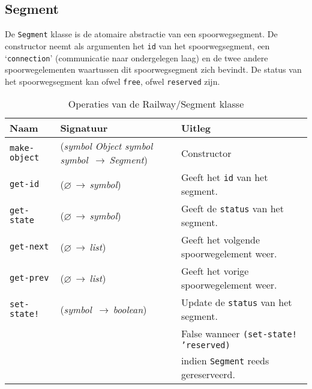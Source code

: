 \documentclass[a4paper, 11pt]{article}
\newcommand{\naar}{\,$\rightarrow$\,}
\renewcommand{\empty}{$\varnothing$}
\newcommand{\<}{\scriptsize\textless\normalsize}
\renewcommand{\>}{\scriptsize\textgreater\normalsize}
\begin{document}
\subsection{Segment} %
De \texttt{Segment} klasse is de atomaire abstractie van een spoorwegsegment. De constructor neemt als argumenten het \texttt{id} van het spoorwegsegment, een \lq\texttt{connection}' (communicatie naar ondergelegen laag) en de twee andere spoorwegelementen waartussen dit spoorwegsegment zich bevindt. De status van het spoorwegsegment kan ofwel \texttt{free}, ofwel \texttt{reserved} zijn.
\begin{table}[H]
	\begin{center}
		{
		\begin{tabular}{|l l l|}
			\hline
			\textbf{Naam} & \textbf{Signatuur} & \textbf{Uitleg}\\
			\hline
			\texttt{make-object} & (\textit{symbol Object symbol symbol} \naar \textit{Segment}) & Constructor\\
			\hline
			\texttt{get-id} & (\empty \naar \textit{symbol}) & Geeft het \texttt{id} van het segment.\\
			\texttt{get-state} & (\empty \naar \textit{symbol}) & Geeft de \texttt{status} van het segment.\\
			\texttt{get-next} & (\empty \naar \textit{list}) & Geeft het volgende spoorwegelement weer.\\
			\texttt{get-prev} & (\empty \naar \textit{list}) & Geeft het vorige spoorwegelement weer.\\
			\texttt{set-state!} & (\textit{symbol} \naar \textit{boolean}) & Update de \texttt{status} van het segment.\\
			&& False wanneer \texttt{(set-state! 'reserved)}\\
			&& indien \texttt{Segment} reeds gereserveerd.\\
			\hline
		\end{tabular}}
		\caption{Operaties van de Railway/Segment klasse}
	\end{center}
\end{table}
\end{document}
